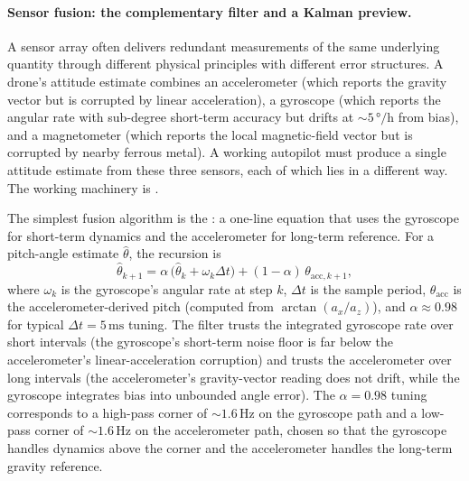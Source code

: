 \paragraph{Sensor fusion: the complementary filter and a Kalman
preview.} A sensor array often delivers redundant measurements of
the same underlying quantity through different physical principles
with different error structures. A drone's attitude estimate
combines an accelerometer (which reports the gravity vector but is
corrupted by linear acceleration), a gyroscope (which reports the
angular rate with sub-degree short-term accuracy but drifts at
$\sim 5 \,\si{\degree}/\si{\hour}$ from bias), and a magnetometer
(which reports the local magnetic-field vector but is corrupted by
nearby ferrous metal). A working autopilot must produce a single
attitude estimate from these three sensors, each of which lies in a
different way. The working machinery is .

The simplest fusion algorithm is the
: a one-line equation that uses the
gyroscope for short-term dynamics and the accelerometer for
long-term reference. For a pitch-angle estimate $\hat{\theta}$, the
recursion is
\[
\hat{\theta}_{k+1} = \alpha \, \big( \hat{\theta}_{k} +
\omega_{k} \Delta t \big) + (1 - \alpha) \, \theta_{\text{acc},k+1},
\]
where $\omega_{k}$ is the gyroscope's angular rate at step $k$,
$\Delta t$ is the sample period, $\theta_{\text{acc}}$ is the
accelerometer-derived pitch (computed from
$\arctan(a_{x} / a_{z})$), and $\alpha \approx 0.98$ for typical
$\Delta t = 5 \,\si{\milli\second}$ tuning. The filter trusts the
integrated gyroscope rate over short intervals (the gyroscope's
short-term noise floor is far below the accelerometer's
linear-acceleration corruption) and trusts the accelerometer over
long intervals (the accelerometer's gravity-vector reading does not
drift, while the gyroscope integrates bias into unbounded angle
error). The $\alpha = 0.98$ tuning corresponds to a high-pass corner
of $\sim 1.6 \,\si{\hertz}$ on the gyroscope path and a low-pass
corner of $\sim 1.6 \,\si{\hertz}$ on the accelerometer path,
chosen so that the gyroscope handles dynamics above the corner and
the accelerometer handles the long-term gravity reference.

